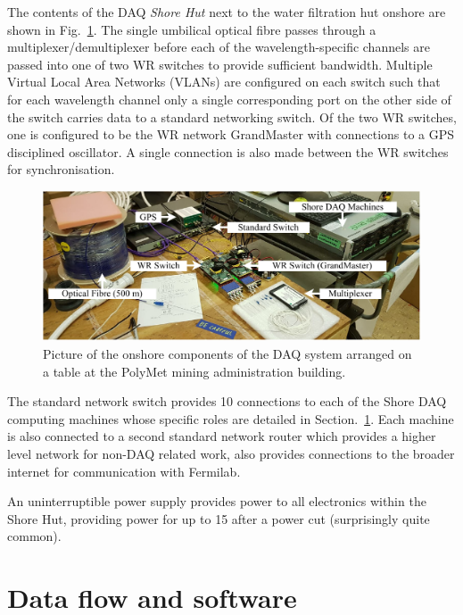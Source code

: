 The contents of the DAQ \emph{Shore Hut} next to the water filtration hut onshore are shown in
Fig.~\ref{fig:hut_daq}. The single umbilical optical fibre passes through a
multiplexer/demultiplexer before each of the wavelength-specific channels are passed into one of
two WR switches to provide sufficient bandwidth. Multiple Virtual Local Area Networks (VLANs) are
configured on each switch such that for each wavelength channel only a single corresponding port
on the other side of the switch carries data to a standard networking switch. Of the two WR
switches, one is configured to be the WR network GrandMaster with connections to a GPS disciplined
oscillator. A single connection is also made between the WR switches for synchronisation.

\begin{figure} %
    \includegraphics[width=\textwidth]{diagrams/5-daq/hut_daq.pdf}
    \caption[Picture of the onshore components of the \chipsfive DAQ system]
    {Picture of the onshore components of the \chipsfive DAQ system arranged on a table at the
        PolyMet mining administration building.}
    \label{fig:hut_daq}
\end{figure}

The standard network switch provides \unit{10}{} connections to each of the Shore DAQ
computing machines whose specific roles are detailed in Section.~\ref{sec:daq_soft}. Each machine
is also connected to a second standard network router which provides a higher level \chips network
for non-DAQ related work, also provides connections to the broader internet for communication with
Fermilab.

An uninterruptible power supply provides power to all electronics within the Shore Hut, providing
power for up to \unit{15}{} after a power cut (surprisingly quite common).

\section{Data flow and software} %
\label{sec:daq_soft} %

